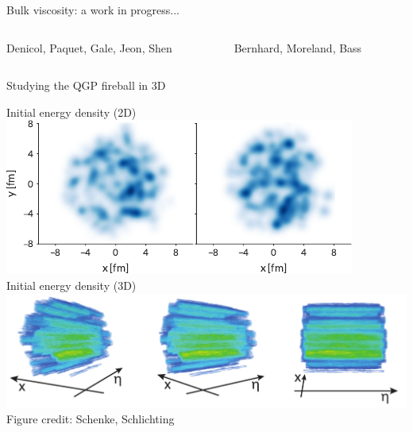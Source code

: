 \documentclass{beamer}
\begin{document}
\begin{frame}{Bulk viscosity: a work in progress...}{}
  \begin{columns}[b]
    \begin{column}{.38\textwidth}
      \centering \scriptsize Denicol, Paquet, Gale, Jeon, Shen
    \end{column}
    \begin{column}{.62\textwidth}
      \centering \scriptsize Bernhard, Moreland, Bass
    \end{column}
  \end{columns}
\end{frame}

\begin{frame}{Studying the QGP fireball in 3D}
  \begin{center}
    Initial energy density (2D)\\[.5ex]
    \includegraphics[width=.6\textwidth]{trento2d}\\[1ex]
    Initial energy density (3D)\\[.5ex]
    \includegraphics[width=.8\textwidth]{three_dim}\\
    {\tiny Figure credit: Schenke, Schlichting}
  \end{center}
\end{frame}
\end{document}
